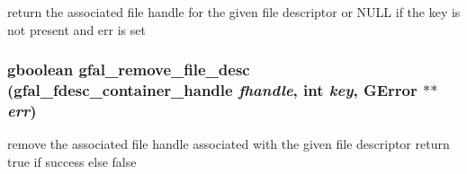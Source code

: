 return the associated file handle for the given file descriptor or NULL if the key is not present and err is set 
\subsubsection{\setlength{\rightskip}{0pt plus 5cm}gboolean gfal\_\-remove\_\-file\_\-desc (gfal\_\-fdesc\_\-container\_\-handle {\em fhandle}, int {\em key}, GError $\ast$$\ast$ {\em err})}\label{gfal__common__filedescriptor_8h_4b10e1d3a5ffde849302fffdba207835}


remove the associated file handle associated with the given file descriptor return true if success else false 